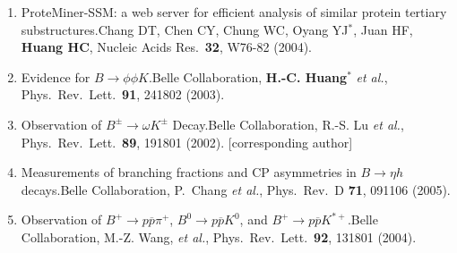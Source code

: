 \documentclass[10pt,a4paper]{article}
\def\mypub#1#2#3{{#1.}\newline #2, #3.}
\def\cited#1{Cited $\ge$ #1}
\def\PRL{Phys.\ Rev.\ Lett.\ }
\def\etal{{\it et al.}}
\newcommand{\hch}{{\bf H.C.~Huang}}
\def\impf#1#2{\def\tempa{}\def\tempb{#2}\ifx\tempa\tempb%
IF: #1%
\else
IF: #1, #2\%%
\fi
}
\def\inar{\impf{6.954}{}}
\def\iprd{\impf{4.696}{16.7}}
\begin{document}
\begin{enumerate}
\item
\mypub{ProteMiner-SSM: a web server for efficient analysis of similar protein tertiary substructures}
{Chang DT, Chen CY, Chung WC, Oyang YJ$^{*}$, Juan HF, {\bf Huang HC}}
{Nucleic Acids Res.\ {\bf 32}, W76-82 (2004)}








\item
\mypub{Evidence for $B \to \phi \phi K$}
{Belle Collaboration, {\bf H.-C. Huang$^*$} \etal}
{\PRL {\bf 91}, 241802 (2003)}

\item
\mypub{Observation of $B^{\pm} \to \omega K^{\pm}$ Decay}
{Belle Collaboration, R.-S. Lu \etal}
{\PRL {\bf 89}, 191801 (2002)}
[{corresponding author}]


\item
\mypub{Measurements of branching fractions and CP asymmetries in $B \to \eta h$ decays}
{Belle Collaboration, P.~Chang {\it et al.}}
{Phys.\ Rev.\ D {\bf 71}, 091106 (2005)}
  
\item
\mypub{Observation of $B^+ \to p \overline{p} \pi^+$, $B^0 \to p \overline{p} K^0$, and $B^+ \to p \overline{p} K^{*+}$}
{Belle Collaboration, M.-Z. Wang, \etal}
{\PRL {\bf 92}, 131801 (2004)}


\end{enumerate}
\end{document}
